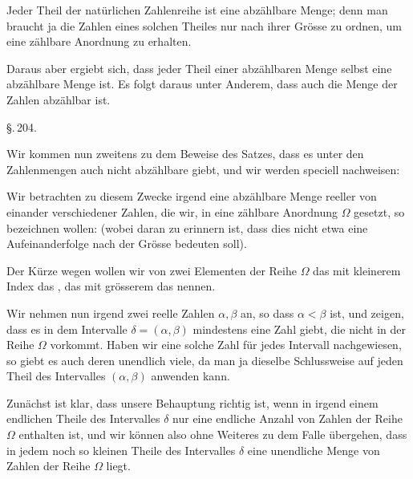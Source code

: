 Jeder Theil der natürlichen Zahlenreihe ist eine abzählbare Menge; denn man braucht ja die Zahlen eines solchen Theiles nur nach ihrer Grösse zu ordnen, um eine zählbare Anordnung zu erhalten.

Daraus aber ergiebt sich, dass jeder Theil einer abzählbaren Menge selbst eine abzählbare Menge ist. Es folgt daraus unter Anderem, dass auch die Menge der  Zahlen abzählbar ist.

\begin{center}
\S.\,204.

\end{center}

Wir kommen nun zweitens zu dem Beweise des Satzes, dass es unter den Zahlenmengen auch nicht abzählbare giebt, und wir werden speciell nachweisen:

\begin{center}
\end{center}

Wir betrachten zu diesem Zwecke irgend eine abzählbare Menge reeller von einander verschiedener Zahlen, die wir, in eine zählbare Anordnung $\Omega$ gesetzt, so bezeichnen wollen:
(wobei daran zu erinnern ist, dass dies nicht etwa eine Aufeinanderfolge nach der Grösse bedeuten soll).

Der Kürze wegen wollen wir von zwei Elementen der Reihe $\Omega$ das mit kleinerem Index das , das mit grösserem das  nennen.

Wir nehmen nun irgend zwei reelle Zahlen $\alpha, \beta$ an, so dass $\alpha < \beta$ ist, und zeigen, dass es in dem Intervalle $\delta = (\alpha, \beta)$ mindestens eine Zahl giebt, die nicht in der Reihe $\Omega$ vorkommt. Haben wir eine solche Zahl für jedes Intervall nachgewiesen, so giebt es auch deren unendlich viele, da man ja dieselbe Schlussweise auf jeden Theil des Intervalles $(\alpha, \beta)$ anwenden kann.

Zunächst ist klar, dass unsere Behauptung richtig ist, wenn in irgend einem endlichen Theile des Intervalles $\delta$ nur eine endliche Anzahl von Zahlen der Reihe $\Omega$ enthalten ist, und wir können also ohne Weiteres zu dem Falle übergehen, dass in jedem noch so kleinen Theile des Intervalles $\delta$ eine unendliche Menge von Zahlen der Reihe $\Omega$ liegt.
